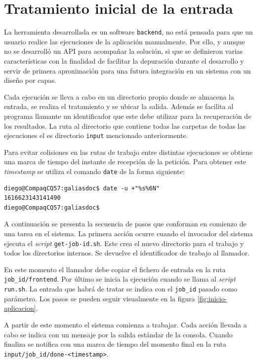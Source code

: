 \section{Tratamiento inicial de la entrada}

La herramienta desarrollada es un software \verb|backend|, no está pensada para que un usuario realice las ejecuciones de la aplicación manualmente. Por ello, y aunque no se desarrolló un API para acompañar la solución, si que se definieron varias características con la finalidad de facilitar la depuración durante el desarrollo y servir de primera aproximación para una futura integración en un sistema con un diseño por capas.

Cada ejecución se lleva a cabo en un directorio propio donde se almacena la entrada, se realiza el tratamiento y se ubicar la salida. Además se facilita al programa llamante un identificador que este debe utilizar para la recuperación de los resultados. La ruta al directorio que contiene todas las carpetas de todas las ejecuciones el es directorio \verb|input| mencionado anteriormente.

Para evitar colisiones en las rutas de trabajo entre distintas ejecuciones se obtiene una marca de tiempo del instante de recepción de la petición. Para obtener este \emph{timestamp} se utiliza el comando \verb|date| de la forma siguiente:

\begin{verbatim}
diego@CompaqCQ57:galiasdoc$ date -u +"%s%6N"
1616623143141490
diego@CompaqCQ57:galiasdoc$
\end{verbatim}

A continuación se presenta la secuencia de pasos que conforman en comienzo de una tarea en el sistema. La primera acción ocurre cuando el invocador del sistema ejecuta el \emph{script} \verb|get-job-id.sh|. Este crea el nuevo directorio para el trabajo y todos los directorios internos. Se devuelve el identificador de trabajo al llamador.

En este momento el llamador debe copiar el fichero de entrada en la ruta \verb|job_id/frontend|. Por último se inicia la ejecución cuando se llama al \emph{script} \verb|run.sh|. La entrada que habrá de tratar se indica con el \verb|job_id| pasado como parámetro. Los pasos se pueden seguir visualmente en la figura \ref{fig:inicio-aplicacion}. 

A partir de este momento el sistema comienza a trabajar. Cada acción llevada a cabo se indica con un mensaje por la salida estándar de la consola. Cuando finaliza se notifica con una marca de tiempo del momento final en la ruta \verb|input/job_id/done-<timestamp>|.

